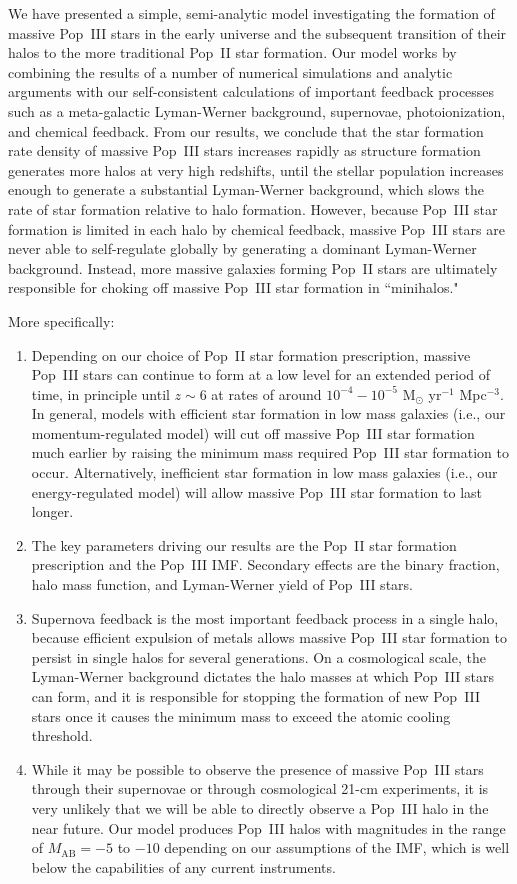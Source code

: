 \documentclass[a4paper,fleqn,usenatbib]{mnras}
\begin{document}
We have presented a simple, semi-analytic model investigating the formation of
massive Pop~III stars in the early universe and the subsequent transition of their halos to the more traditional Pop~II star formation. Our model works by combining the results of a number of numerical simulations and analytic arguments with our self-consistent calculations of important feedback processes such as a meta-galactic Lyman-Werner background, supernovae, photoionization, and chemical feedback. From our results, we 
conclude that the star formation rate density of massive Pop~III stars increases rapidly as structure formation generates more halos at very high redshifts, until the stellar population increases enough to generate a substantial Lyman-Werner background, which slows the rate of star formation relative to halo formation. However, because Pop~III star formation is limited in each halo by chemical feedback, massive Pop~III stars are never able to self-regulate globally by generating a dominant Lyman-Werner background. Instead, more massive galaxies forming Pop~II stars are ultimately responsible for choking off massive Pop~III star formation in ``minihalos."

More specifically:
\begin{enumerate}
\item Depending on our choice of Pop~II star formation prescription, massive Pop~III stars can continue to form at a low level for an extended period of time, 
in principle until $z \sim 6$ at rates of around $10^{-4} - 10^{-5}$ M$_\odot$ yr$^{-1}$ Mpc$^{-3}$. In general, 
models with efficient star formation in low mass galaxies (i.e., our momentum-regulated model) will cut off massive Pop~III star formation much earlier by raising the minimum mass required Pop~III star formation to occur. Alternatively, inefficient star formation in low mass galaxies (i.e., our energy-regulated model) will allow massive Pop~III star formation to last longer.
\item The key parameters 
driving our results are the Pop~II star formation prescription and the Pop~III IMF. Secondary effects are the binary fraction, halo mass function, and Lyman-Werner yield of Pop~III stars.
\item Supernova
feedback is the most important feedback process in a single halo, 
because efficient expulsion of metals allows massive Pop~III star formation to persist in single halos for several generations. 
On a cosmological scale, the Lyman-Werner background 
dictates the halo masses at which Pop~III stars can form, and it is responsible for stopping the formation of new Pop~III stars once it causes the minimum mass to exceed the atomic cooling threshold.
\item While it may be possible to observe the presence of massive Pop~III stars through their supernovae or through cosmological 21-cm experiments, it is very unlikely that we will be able to directly observe a Pop~III halo in the near future. Our model produces Pop~III halos with magnitudes in the range of 
$M_\text{AB} = -5$ to $-10$ depending on our assumptions of the IMF, which is well below the capabilities of any current instruments.
\end{enumerate}
\end{document}

